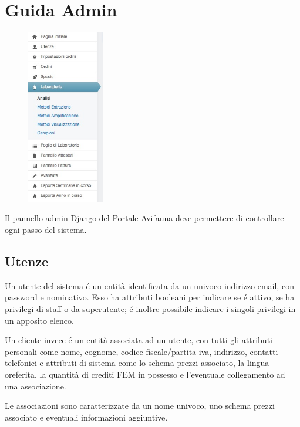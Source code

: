 \chapter{Guida Admin}
\label{app:admin}

\begin{figure}
  \begin{center}
    \includegraphics[width=0.3\textwidth]{images/suit}
  \end{center}
\end{figure}

Il pannello admin Django del Portale Avifauna deve permettere di controllare ogni passo del sistema.

\section*{Utenze}
Un \textsf{utente} del sistema é un entità identificata da un univoco indirizzo email, con password e nominativo. Esso ha attributi booleani per indicare se é attivo, se ha privilegi di staff o da superutente; é inoltre possibile indicare i singoli privilegi in un apposito elenco.

Un \textsf{cliente} invece é un entità associata ad un utente, con tutti gli attributi personali come nome, cognome, codice fiscale/partita iva, indirizzo, contatti telefonici e attributi di sistema come lo schema prezzi associato, la lingua oreferita, la quantità di crediti FEM in possesso e l'eventuale collegamento ad una associazione.

Le \textsf{associazioni} sono caratterizzate da un nome univoco, uno schema prezzi associato e eventuali informazioni aggiuntive.

